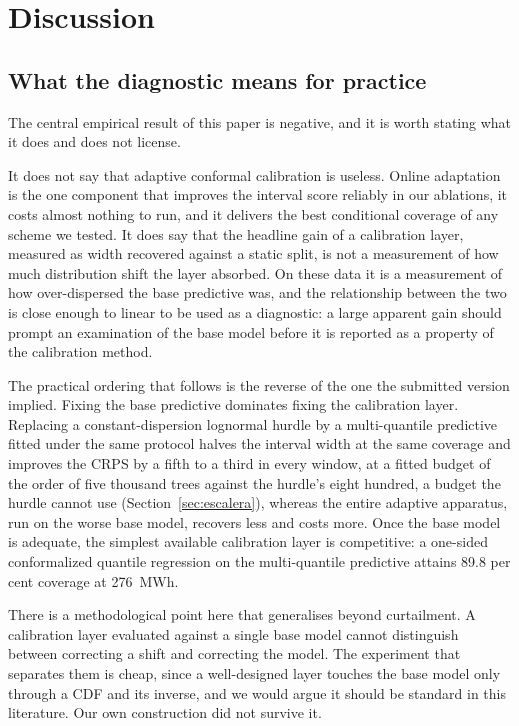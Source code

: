 \documentclass[preprint,3p,times]{elsarticle}
\begin{document}


\section{Discussion}
\label{sec:discussion}

\subsection{What the diagnostic means for practice}

The central empirical result of this paper is negative, and it is worth stating what it does and does not license.

It does not say that adaptive conformal calibration is useless. Online adaptation is the one component that improves the interval score reliably in our ablations, it costs almost nothing to run, and it delivers the best conditional coverage of any scheme we tested. It does say that the headline gain of a calibration layer, measured as width recovered against a static split, is not a measurement of how much distribution shift the layer absorbed. On these data it is a measurement of how over-dispersed the base predictive was, and the relationship between the two is close enough to linear to be used as a diagnostic: a large apparent gain should prompt an examination of the base model before it is reported as a property of the calibration method.

The practical ordering that follows is the reverse of the one the submitted version implied. Fixing the base predictive dominates fixing the calibration layer. Replacing a constant-dispersion lognormal hurdle by a multi-quantile predictive fitted under the same protocol halves the interval width at the same coverage and improves the CRPS by a fifth to a third in every window, at a fitted budget of the order of five thousand trees against the hurdle's eight hundred, a budget the hurdle cannot use (Section~\ref{sec:escalera}), whereas the entire adaptive apparatus, run on the worse base model, recovers less and costs more. Once the base model is adequate, the simplest available calibration layer is competitive: a one-sided conformalized quantile regression on the multi-quantile predictive attains 89.8 per cent coverage at 276~MWh.

There is a methodological point here that generalises beyond curtailment. A calibration layer evaluated against a single base model cannot distinguish between correcting a shift and correcting the model. The experiment that separates them is cheap, since a well-designed layer touches the base model only through a CDF and its inverse, and we would argue it should be standard in this literature. Our own construction did not survive it.
\end{document}
